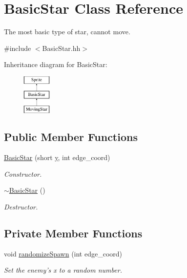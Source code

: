 \hypertarget{classBasicStar}{\section{Basic\-Star Class Reference}
\label{classBasicStar}
}


The most basic type of star, cannot move.  




{\ttfamily \#include $<$Basic\-Star.\-hh$>$}

Inheritance diagram for Basic\-Star\-:\begin{figure}[H]
\begin{center}
\leavevmode
\includegraphics[height=2.000000cm]{classBasicStar}
\end{center}
\end{figure}
\subsection*{Public Member Functions}
\begin{DoxyCompactItemize}
\item 
\hyperlink{classBasicStar_a7cda590583a4a67c057487c7fc61281b}{Basic\-Star} (short \hyperlink{classSprite_afca2c03aad9d2526427470688ae76439}{y}, int edge\-\_\-coord)
\begin{DoxyCompactList}\small\item\em Constructor. \end{DoxyCompactList}\item 
\hyperlink{classBasicStar_a6ac994000481a4e155a16c4f96f9e17b}{$\sim$\-Basic\-Star} ()
\begin{DoxyCompactList}\small\item\em Destructor. \end{DoxyCompactList}\end{DoxyCompactItemize}
\subsection*{Private Member Functions}
\begin{DoxyCompactItemize}
\item 
void \hyperlink{classBasicStar_ad978bef7512c6f5df863049d90cf0da8}{randomize\-Spawn} (int edge\-\_\-coord)
\begin{DoxyCompactList}\small\item\em Set the enemy's x to a random number. \end{DoxyCompactList}\end{DoxyCompactItemize}
